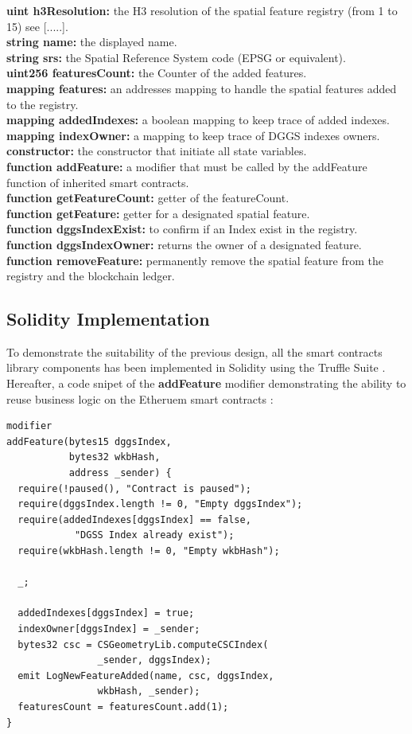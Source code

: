 \documentclass{isprs} %
\begin{document}
\textbf{uint h3Resolution:} the H3 resolution of the spatial feature registry (from 1 to 15) see [.....]. \\ 
\textbf{string name:} the displayed name. \\
\textbf{string srs:} the Spatial Reference System code (EPSG or equivalent). \\
\textbf{uint256 featuresCount:} the Counter of the added features. \\
\textbf{mapping features:} an addresses mapping to handle the spatial features added to the registry. \\
\textbf{mapping addedIndexes:} a boolean mapping to keep trace of added indexes. \\
\textbf{mapping indexOwner:} a mapping to keep trace of DGGS indexes owners. \\
\textbf{constructor:} the constructor that initiate all state variables. \\
\textbf{function addFeature:} a modifier that must be called by the addFeature function of inherited smart contracts. \\
\textbf{function getFeatureCount:} getter of the featureCount. \\
\textbf{function getFeature:} getter for a designated spatial feature. \\
\textbf{function dggsIndexExist:} to confirm if an Index exist in the registry. \\
\textbf{function dggsIndexOwner:} returns the owner of a designated feature. \\
\textbf{function removeFeature:} permanently remove the spatial feature from the registry and the blockchain ledger.

\subsection{Solidity Implementation}\label{sec:Solidity Implementation}

To demonstrate the suitability of the previous design, all the smart contracts library components has been implemented in Solidity using the Truffle Suite \cite{truffle}. Hereafter, a code snipet of the \textbf{addFeature} modifier demonstrating the ability to reuse business logic on the Etheruem smart contracts :

\begin{verbatim}
modifier 
addFeature(bytes15 dggsIndex, 
		   bytes32 wkbHash, 
		   address _sender) {
  require(!paused(), "Contract is paused");
  require(dggsIndex.length != 0, "Empty dggsIndex");
  require(addedIndexes[dggsIndex] == false, 
  			"DGSS Index already exist");
  require(wkbHash.length != 0, "Empty wkbHash");

  _;

  addedIndexes[dggsIndex] = true;
  indexOwner[dggsIndex] = _sender;
  bytes32 csc = CSGeometryLib.computeCSCIndex(
  				_sender, dggsIndex); 
  emit LogNewFeatureAdded(name, csc, dggsIndex, 
  				wkbHash, _sender);
  featuresCount = featuresCount.add(1);
}
\end{verbatim}
\end{document}
